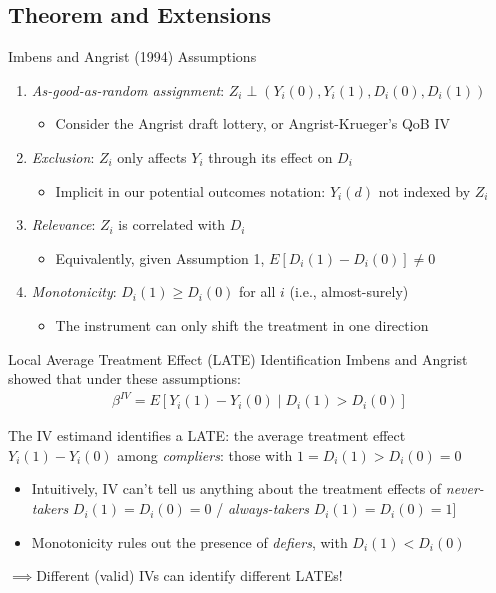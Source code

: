 \documentclass{beamer}
\begin{document}
\subsection{Theorem and Extensions}
\begin{frame}{Imbens and Angrist (1994) Assumptions}
\begin{enumerate}
\item \emph{As-good-as-random assignment}: $Z_i\perp (Y_i(0),Y_i(1),D_i(0),D_i(1))$\smallskip
\begin{itemize}
\item Consider the Angrist draft lottery, or Angrist-Krueger's QoB IV
\end{itemize}\medskip\pause{}
\item \emph{Exclusion}: $Z_i$ only affects $Y_i$ through its effect on $D_i$\smallskip
\begin{itemize}
\item Implicit in our potential outcomes notation: $Y_i(d)$ not indexed by $Z_i$
\end{itemize}\medskip\pause{}
\item \emph{Relevance}: $Z_i$ is correlated with $D_i$\smallskip
\begin{itemize}
\item Equivalently, given Assumption 1, $E[D_{i}(1)-D_i(0)]\neq 0$
\end{itemize}\medskip\pause{}
\item \emph{Monotonicity}: $D_{i}(1)\ge D_{i}(0)$ for all $i$ (i.e., almost-surely)\smallskip
\begin{itemize}
\item The instrument can only shift the treatment in one direction
\end{itemize}
\end{enumerate}
\end{frame}

\begin{frame}{Local Average Treatment Effect (LATE) Identification}
Imbens and Angrist showed that under these assumptions:
\begin{align*}
\beta^{IV}=E[Y_i(1)-Y_i(0)\mid D_i(1)>D_i(0)]
\end{align*}
\vspace{-0.6cm}

The IV estimand identifies a LATE: the average treatment effect $Y_i(1)-Y_i(0)$ among \emph{compliers}: those with $1=D_i(1)>D_i(0)=0$\smallskip\pause{}
\begin{itemize}
\item Intuitively, IV can't tell us anything about the treatment effects of \emph{never-takers} $D_i(1)=D_i(0)=0$ / \emph{always-takers} $D_i(1)=D_i(0)=1$]\smallskip\pause{}
\item Monotonicity rules out the presence of \emph{defiers}, with $D_i(1)<D_i(0)$\pause{}
\end{itemize}\medskip
\begin{center}$\implies$Different (valid) IVs can identify different LATEs! \end{center}
\end{frame}
\end{document}
